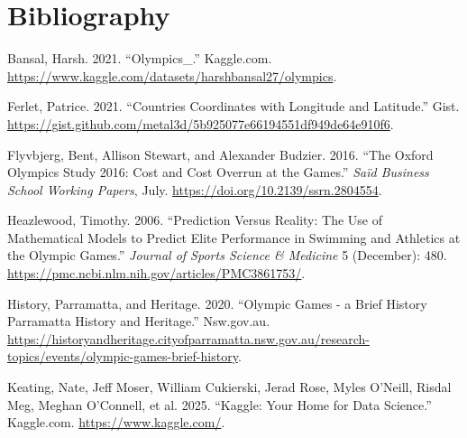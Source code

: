 \documentclass[
]{article}
\newlength{\cslhangindent}
\newenvironment{CSLReferences}[2] %
 {\begin{list}{}{%
  \setlength{\itemindent}{0pt}
  \setlength{\leftmargin}{0pt}
  \setlength{\parsep}{0pt}
  \ifodd #1
   \setlength{\leftmargin}{\cslhangindent}
   \setlength{\itemindent}{-1\cslhangindent}
  \fi
  \setlength{\itemsep}{#2\baselineskip}}}
 {\end{list}}
\begin{document}
\newpage

\section*{Bibliography}\label{bibliography}

\label{refs}
\begin{CSLReferences}{1}{0}
Bansal, Harsh. 2021. {``Olympics\_.''} Kaggle.com. \url{https://www.kaggle.com/datasets/harshbansal27/olympics}.

Ferlet, Patrice. 2021. {``Countries Coordinates with Longitude and Latitude.''} Gist. \url{https://gist.github.com/metal3d/5b925077e66194551df949de64e910f6}.

Flyvbjerg, Bent, Allison Stewart, and Alexander Budzier. 2016. {``The Oxford Olympics Study 2016: Cost and Cost Overrun at the Games.''} \emph{Saïd Business School Working Papers}, July. \url{https://doi.org/10.2139/ssrn.2804554}.

Heazlewood, Timothy. 2006. {``Prediction Versus Reality: The Use of Mathematical Models to Predict Elite Performance in Swimming and Athletics at the Olympic Games.''} \emph{Journal of Sports Science \& Medicine} 5 (December): 480. \url{https://pmc.ncbi.nlm.nih.gov/articles/PMC3861753/}.

History, Parramatta, and Heritage. 2020. {``Olympic Games - a Brief History \textbar{} Parramatta History and Heritage.''} Nsw.gov.au. \url{https://historyandheritage.cityofparramatta.nsw.gov.au/research-topics/events/olympic-games-brief-history}.

Keating, Nate, Jeff Moser, William Cukierski, Jerad Rose, Myles O'Neill, Risdal Meg, Meghan O'Connell, et al. 2025. {``Kaggle: Your Home for Data Science.''} Kaggle.com. \url{https://www.kaggle.com/}.

\end{CSLReferences}
\end{document}
